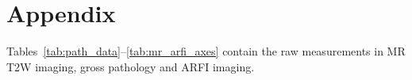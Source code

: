 \section{Appendix}\label{sect:appendix}

Tables~\ref{tab:path_data}--\ref{tab:mr_arfi_axes} contain the raw measurements in 
MR T2W imaging, gross pathology and ARFI imaging.



\clearpage



\clearpage


